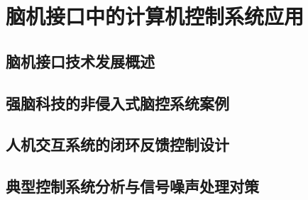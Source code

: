 \section{脑机接口中的计算机控制系统应用}
\subsection{脑机接口技术发展概述}

\subsection{强脑科技的非侵入式脑控系统案例}

\subsection{人机交互系统的闭环反馈控制设计}

\subsection{典型控制系统分析与信号噪声处理对策}

\newpage